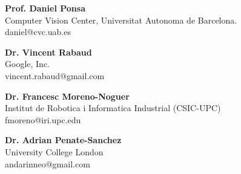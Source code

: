 \textbf{Prof. Daniel Ponsa}\\
Computer Vision Center, Universitat Autonoma de Barcelona.\\
daniel@cvc.uab.es

\textbf{Dr. Vincent Rabaud}\\
Google, Inc.\\
vincent.rabaud@gmail.com

\textbf{Dr. Francesc Moreno-Noguer}\\
Institut de Robotica i Informatica Industrial (CSIC-UPC)   
\\
fmoreno@iri.upc.edu

\textbf{Dr. Adrian Penate-Sanchez}\\
University College London\\
andarinneo@gmail.com